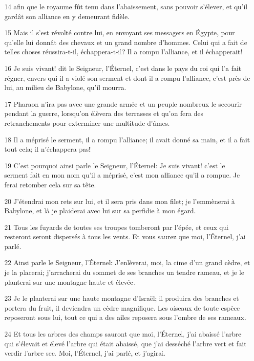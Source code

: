 \par 14 afin que le royaume fût tenu dans l'abaissement, sans pouvoir s'élever, et qu'il gardât son alliance en y demeurant fidèle.
\par 15 Mais il s'est révolté contre lui, en envoyant ses messagers en Égypte, pour qu'elle lui donnât des chevaux et un grand nombre d'hommes. Celui qui a fait de telles choses réussira-t-il, échappera-t-il? Il a rompu l'alliance, et il échapperait!
\par 16 Je suis vivant! dit le Seigneur, l'Éternel, c'est dans le pays du roi qui l'a fait régner, envers qui il a violé son serment et dont il a rompu l'alliance, c'est près de lui, au milieu de Babylone, qu'il mourra.
\par 17 Pharaon n'ira pas avec une grande armée et un peuple nombreux le secourir pendant la guerre, lorsqu'on élèvera des terrasses et qu'on fera des retranchements pour exterminer une multitude d'âmes.
\par 18 Il a méprisé le serment, il a rompu l'alliance; il avait donné sa main, et il a fait tout cela; il n'échappera pas!
\par 19 C'est pourquoi ainsi parle le Seigneur, l'Éternel: Je suis vivant! c'est le serment fait en mon nom qu'il a méprisé, c'est mon alliance qu'il a rompue. Je ferai retomber cela sur sa tête.
\par 20 J'étendrai mon rets sur lui, et il sera pris dans mon filet; je l'emmènerai à Babylone, et là je plaiderai avec lui sur sa perfidie à mon égard.
\par 21 Tous les fuyards de toutes ses troupes tomberont par l'épée, et ceux qui resteront seront dispersés à tous les vents. Et vous saurez que moi, l'Éternel, j'ai parlé.
\par 22 Ainsi parle le Seigneur, l'Éternel: J'enlèverai, moi, la cime d'un grand cèdre, et je la placerai; j'arracherai du sommet de ses branches un tendre rameau, et je le planterai sur une montagne haute et élevée.
\par 23 Je le planterai sur une haute montagne d'Israël; il produira des branches et portera du fruit, il deviendra un cèdre magnifique. Les oiseaux de toute espèce reposeront sous lui, tout ce qui a des ailes reposera sous l'ombre de ses rameaux.
\par 24 Et tous les arbres des champs sauront que moi, l'Éternel, j'ai abaissé l'arbre qui s'élevait et élevé l'arbre qui était abaissé, que j'ai desséché l'arbre vert et fait verdir l'arbre sec. Moi, l'Éternel, j'ai parlé, et j'agirai.

